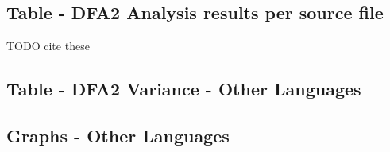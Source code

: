 \label{FullResultsOther}
\subsection{Table - DFA2 Analysis results per source file}
TODO cite these

\newpage
\subsection{Table - DFA2 Variance - Other Languages}\label{FullResultsOtherVariance}

\newpage
\subsection{Graphs - Other Languages}
\begin{center}

\end{center}

